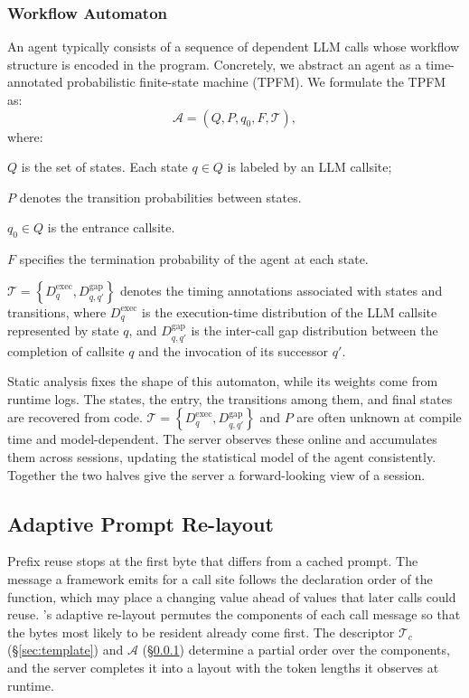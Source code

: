 \subsubsection{Workflow Automaton}
\label{sec:TPFM}
An agent typically consists of a sequence of dependent LLM calls whose workflow structure is encoded in the program. Concretely, we abstract an agent as a time-annotated probabilistic finite-state machine (TPFM). We formulate the TPFM as: 
\[
\mathcal{A} = (Q, P, q_0, F, \mathcal{T}),
\]
where:
\begin{enumerate*}[label=(\roman*)]
    \item $Q$ is the set of states. Each state $q\in Q$ is labeled by an LLM callsite;
    \item $P$ denotes the transition probabilities between states.
    \item $q_0 \in Q$ is the entrance callsite.
    \item $F$ specifies the termination probability of the agent at each state.
    \item $\mathcal{T} = \left\{D^{\mathrm{exec}}_q, D^{\mathrm{gap}}_{q,q'}\right\}$ denotes the timing annotations associated with states and transitions, where $D^{\mathrm{exec}}_q$ is the execution-time distribution of the LLM callsite represented by state $q$, and $D^{\mathrm{gap}}_{q,q'}$ is the inter-call gap distribution between the completion of callsite $q$ and the invocation of its successor $q'$.
\end{enumerate*}

Static analysis fixes the shape of this automaton, while its weights come from runtime logs. The states, the entry, the transitions among them, and final states are recovered from code. $\mathcal{T} = \left\{D^{\mathrm{exec}}_q, D^{\mathrm{gap}}_{q,q'}\right\}$ and $P$ are often unknown at compile time and model-dependent. The server observes these online and accumulates them across sessions, updating the statistical model of the agent consistently. Together the two halves give the server a forward-looking view of a session.

\subsection{Adaptive Prompt Re-layout}
\label{sec:relayout}
Prefix reuse stops at the first byte that differs from a cached prompt. The message a framework emits for a call site follows the declaration order of the function, which may place a changing value ahead of values that later calls could reuse. \sysname's adaptive re-layout permutes the components of each call message so that the bytes most likely to be resident already come first. The descriptor $\mathcal{T}_c$ (\S\ref{sec:template}) and $\mathcal{A}$ (\S\ref{sec:TPFM}) determine a partial order over the components, and the server completes it into a layout with the token lengths it observes at runtime.
